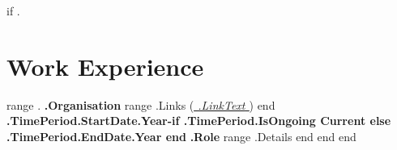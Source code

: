 {{if .}}
\section{Work Experience}
  \resumeSubHeadingListStart
    {{range .}}
\resumeSubheading
      {\textbf{ {{.Organisation}} } {{range .Links}} (\href{ {{.LinkURL}} }{\emph{\underline{ {{.LinkText}} }}}) {{end}} }
      {\textbf{ {{.TimePeriod.StartDate.Year}}-{{if .TimePeriod.IsOngoing}} Current {{else}} {{.TimePeriod.EndDate.Year}} {{end}} }}
      {\textbf{ {{.Role}} }}{}
      \resumeItemListStart
      {{range .Details}}
    {{end}}
      \resumeItemListEnd
      {{end}}
\vspace{-16pt}
{{end}}